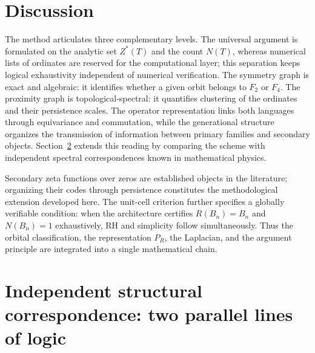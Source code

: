 \documentclass[11pt]{amsart}
\theoremstyle{definition}
\theoremstyle{remark}
\begin{document}
\section{Discussion}
The method articulates three complementary levels. The universal argument is formulated on the analytic set $Z^*(T)$ and the count $N(T)$, whereas numerical lists of ordinates are reserved for the computational layer; this separation keeps logical exhaustivity independent of numerical verification. The symmetry graph is exact and algebraic: it identifies whether a given orbit belongs to $F_2$ or $F_4$. The proximity graph is topological-spectral: it quantifies clustering of the ordinates and their persistence scales. The operator representation links both languages through equivariance and commutation, while the generational structure organizes the transmission of information between primary families and secondary objects. Section~\ref{sec:correspondencia} extends this reading by comparing the scheme with independent spectral correspondences known in mathematical physics.

Secondary zeta functions over zeros are established objects in the literature; organizing their codes through persistence constitutes the methodological extension developed here. The unit-cell criterion further specifies a globally verifiable condition: when the architecture certifies $R(B_n)=B_n$ and $N(B_n)=1$ exhaustively, RH and simplicity follow simultaneously. Thus the orbital classification, the representation $P_R$, the Laplacian, and the argument principle are integrated into a single mathematical chain.

\section{Independent structural correspondence: two parallel lines of logic}\label{sec:correspondencia}
\end{document}
